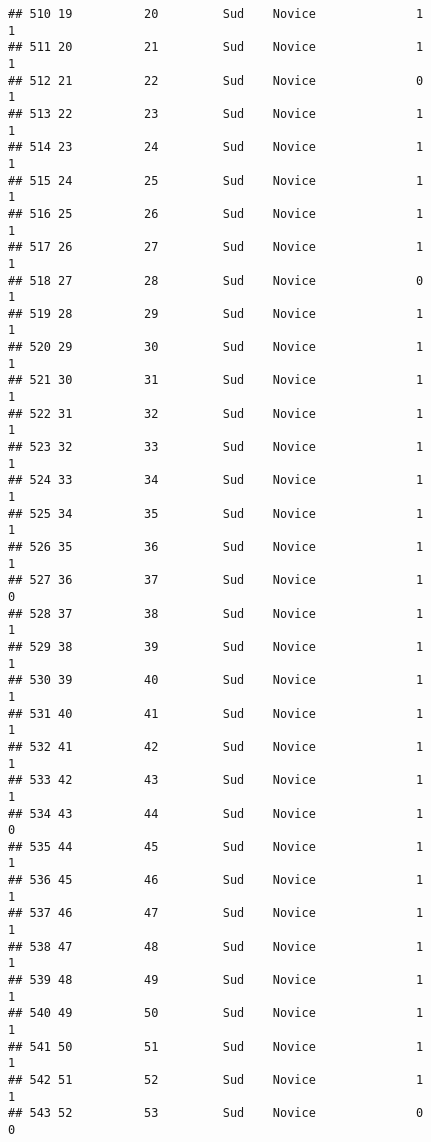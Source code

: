 \documentclass[
]{article}
\begin{document}
\begin{verbatim}
## 510 19          20         Sud    Novice              1                 1
## 511 20          21         Sud    Novice              1                 1
## 512 21          22         Sud    Novice              0                 1
## 513 22          23         Sud    Novice              1                 1
## 514 23          24         Sud    Novice              1                 1
## 515 24          25         Sud    Novice              1                 1
## 516 25          26         Sud    Novice              1                 1
## 517 26          27         Sud    Novice              1                 1
## 518 27          28         Sud    Novice              0                 1
## 519 28          29         Sud    Novice              1                 1
## 520 29          30         Sud    Novice              1                 1
## 521 30          31         Sud    Novice              1                 1
## 522 31          32         Sud    Novice              1                 1
## 523 32          33         Sud    Novice              1                 1
## 524 33          34         Sud    Novice              1                 1
## 525 34          35         Sud    Novice              1                 1
## 526 35          36         Sud    Novice              1                 1
## 527 36          37         Sud    Novice              1                 0
## 528 37          38         Sud    Novice              1                 1
## 529 38          39         Sud    Novice              1                 1
## 530 39          40         Sud    Novice              1                 1
## 531 40          41         Sud    Novice              1                 1
## 532 41          42         Sud    Novice              1                 1
## 533 42          43         Sud    Novice              1                 1
## 534 43          44         Sud    Novice              1                 0
## 535 44          45         Sud    Novice              1                 1
## 536 45          46         Sud    Novice              1                 1
## 537 46          47         Sud    Novice              1                 1
## 538 47          48         Sud    Novice              1                 1
## 539 48          49         Sud    Novice              1                 1
## 540 49          50         Sud    Novice              1                 1
## 541 50          51         Sud    Novice              1                 1
## 542 51          52         Sud    Novice              1                 1
## 543 52          53         Sud    Novice              0                 0

\end{verbatim}
\end{document}
